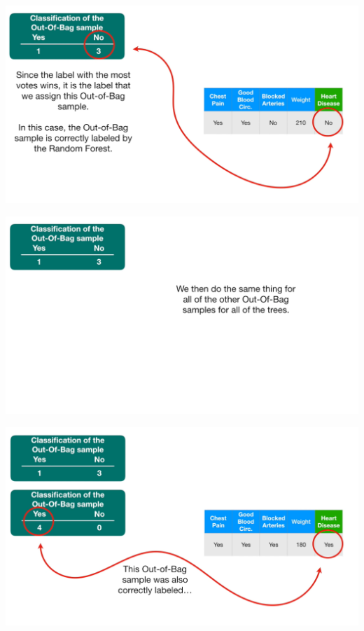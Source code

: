 \documentclass[
  ignorenonframetext,
]{beamer}
\begin{document}
\begin{frame}{}
\protect\hypertarget{section-80}{}
\includegraphics{images/r81.png}
\end{frame}

\begin{frame}{}
\protect\hypertarget{section-81}{}
\includegraphics{images/r82.png}
\end{frame}

\begin{frame}{}
\protect\hypertarget{section-82}{}
\includegraphics{images/r83.png}
\end{frame}
\end{document}
